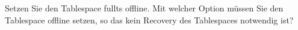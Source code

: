     \item Setzen Sie den Tablespace fullts offline. Mit welcher Option müssen Sie den Tablespace offline setzen, so das kein Recovery des Tablespaces notwendig ist?
